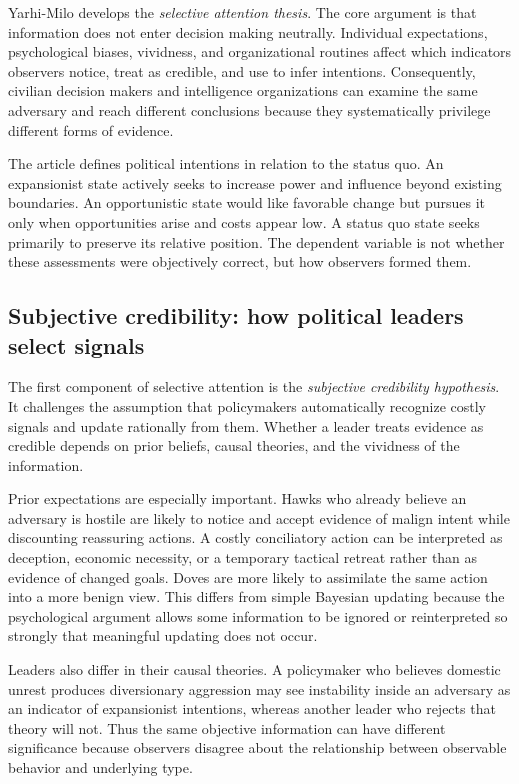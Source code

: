 Yarhi-Milo develops the \emph{selective attention thesis}. The core argument is that information does not enter decision making neutrally. Individual expectations, psychological biases, vividness, and organizational routines affect which indicators observers notice, treat as credible, and use to infer intentions. Consequently, civilian decision makers and intelligence organizations can examine the same adversary and reach different conclusions because they systematically privilege different forms of evidence.

The article defines political intentions in relation to the status quo. An expansionist state actively seeks to increase power and influence beyond existing boundaries. An opportunistic state would like favorable change but pursues it only when opportunities arise and costs appear low. A status quo state seeks primarily to preserve its relative position. The dependent variable is not whether these assessments were objectively correct, but how observers formed them.

\subsection{Subjective credibility: how political leaders select signals}

The first component of selective attention is the \emph{subjective credibility hypothesis}. It challenges the assumption that policymakers automatically recognize costly signals and update rationally from them. Whether a leader treats evidence as credible depends on prior beliefs, causal theories, and the vividness of the information.

Prior expectations are especially important. Hawks who already believe an adversary is hostile are likely to notice and accept evidence of malign intent while discounting reassuring actions. A costly conciliatory action can be interpreted as deception, economic necessity, or a temporary tactical retreat rather than as evidence of changed goals. Doves are more likely to assimilate the same action into a more benign view. This differs from simple Bayesian updating because the psychological argument allows some information to be ignored or reinterpreted so strongly that meaningful updating does not occur.

Leaders also differ in their causal theories. A policymaker who believes domestic unrest produces diversionary aggression may see instability inside an adversary as an indicator of expansionist intentions, whereas another leader who rejects that theory will not. Thus the same objective information can have different significance because observers disagree about the relationship between observable behavior and underlying type.

